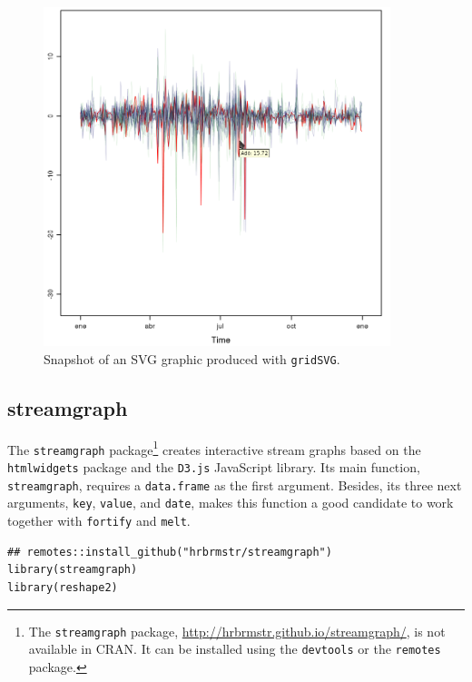 \begin{figure}
  \centering
  \includegraphics[width=0.9\textwidth]{figs/navarraSVG_captura.png}
  \caption{\label{fig:navarraSVG}Snapshot of an SVG graphic produced with \texttt{gridSVG}.}
\end{figure}

\subsection{streamgraph \label{sec:interactive_streamgraph}}
\label{sec:orgc9daa39}

The \texttt{streamgraph} package\footnote{The \texttt{streamgraph} package, \url{http://hrbrmstr.github.io/streamgraph/}, is not available in CRAN. It can be installed using the \texttt{devtools} or the \texttt{remotes} package.} creates interactive stream graphs based on
the \texttt{htmlwidgets} package and the \texttt{D3.js} JavaScript library. Its main
function, \texttt{streamgraph}, requires a \texttt{data.frame} as the first
argument. Besides, its three next arguments, \texttt{key}, \texttt{value}, and
\texttt{date}, makes this function a good candidate to work together with
\texttt{fortify} and \texttt{melt}.



\lstset{language=r,label= ,caption= ,captionpos=b,numbers=none}
\begin{lstlisting}
## remotes::install_github("hrbrmstr/streamgraph")
library(streamgraph)
library(reshape2)
\end{lstlisting}

